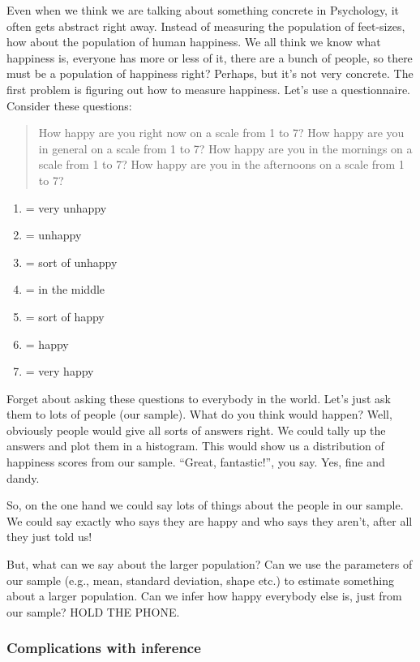 \documentclass[
]{book}
\providecommand{\tightlist}{%
  \setlength{\itemsep}{0pt}\setlength{\parskip}{0pt}}
\begin{document}
Even when we think we are talking about something concrete in Psychology, it often gets abstract right away. Instead of measuring the population of feet-sizes, how about the population of human happiness. We all think we know what happiness is, everyone has more or less of it, there are a bunch of people, so there must be a population of happiness right? Perhaps, but it's not very concrete. The first problem is figuring out how to measure happiness. Let's use a questionnaire. Consider these questions:

\begin{quote}
How happy are you right now on a scale from 1 to 7?
How happy are you in general on a scale from 1 to 7?
How happy are you in the mornings on a scale from 1 to 7?
How happy are you in the afternoons on a scale from 1 to 7?
\end{quote}

\begin{enumerate}
\def\labelenumi{\arabic{enumi}.}
\tightlist
\item
  = very unhappy
\item
  = unhappy
\item
  = sort of unhappy
\item
  = in the middle
\item
  = sort of happy
\item
  = happy
\item
  = very happy
\end{enumerate}

Forget about asking these questions to everybody in the world. Let's just ask them to lots of people (our sample). What do you think would happen? Well, obviously people would give all sorts of answers right. We could tally up the answers and plot them in a histogram. This would show us a distribution of happiness scores from our sample. ``Great, fantastic!'', you say. Yes, fine and dandy.

So, on the one hand we could say lots of things about the people in our sample. We could say exactly who says they are happy and who says they aren't, after all they just told us!

But, what can we say about the larger population? Can we use the parameters of our sample (e.g., mean, standard deviation, shape etc.) to estimate something about a larger population. Can we infer how happy everybody else is, just from our sample? HOLD THE PHONE.

\subsubsection{Complications with inference}\label{complications-with-inference}
\end{document}
